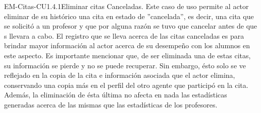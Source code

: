 \begin{UseCase}{EM-Citas-CU1.4.1}{Eliminar citas Canceladas.}
	{
	\noindent
	Este caso de uso permite al actor eliminar de su histórico una cita en estado de ''cancelada'', es decir, una cita que se solicitó a un profesor y que por alguna razón se tuvo que cancelar antes de que s llevara a cabo. El registro que se lleva acerca de las citas canceladas es para brindar mayor información al actor acerca de su desempeño con los alumnos en este aspecto.
	\newline
	Es importante mencionar que, de ser eliminada una de estas citas, su información se pierde y no se puede recuperar. Sin embargo, ésto solo se ve reflejado en la copia de la cita e información asociada que el actor elimina, conservando una copia más en el perfil del otro agente que participó en la cita. Además, la eliminación de ésta última no afecta en nada las estadísticas generadas acerca de las mismas que las estadísticas de los profesores.
	\newline
	}
\end{UseCase}

